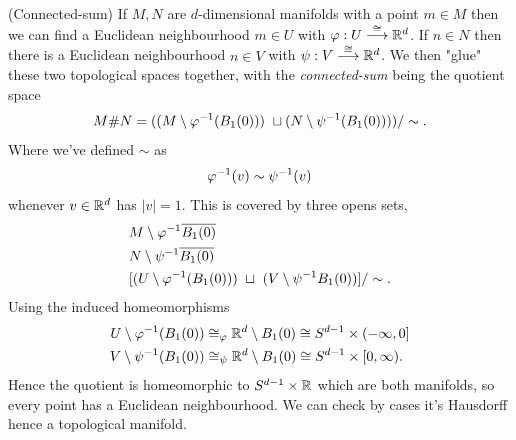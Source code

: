 \documentclass{article}
\begin{document}
\begin{example}
	(Connected-sum) If $ M, N$ are $ d $-dimensional manifolds with a point $ m\in M $ then we can find a Euclidean neighbourhood $ m\in U $ with $ \varphi: U \overset{\cong}{\longrightarrow} \mathbb{R}^d $. If $ n\in N $ then there is a Euclidean neighbourhood $ n\in V $ with $ \psi: V\overset{\cong}{\longrightarrow}\mathbb{R}^d $. We then "glue" these two topological spaces together, with the \textit{connected-sum} being the quotient space
	\[
	  M\#N = ((M \setminus {\varphi}^{-1}(B_1(0))) \ \sqcup (N\setminus {\psi}^{-1} (B_1(0))))/ \sim.
	\]
	Where we've defined $ \sim $ as
	\[
	  {\varphi}^{-1}(v) \sim {\psi}^{-1}(v)
	\]
	whenever $ v\in \mathbb{R}^d $ has $ |v| = 1 $. This is covered by three opens sets,
	\begin{align*}
		&M\setminus {\varphi}^{-1}\overline {B_1(0)} \\
		&N \setminus {\psi}^{-1}\overline{B_1(0)} \\
		&[(U \setminus {\varphi}^{-1}(B_1(0))) \ \sqcup \ (V\setminus {\psi}^{-1} B_1(0))]/\sim.
	\end{align*}
	Using the induced homeomorphisms
	\begin{align*}
		U\setminus {\varphi}^{-1}(B_1(0)) &\cong_\varphi \mathbb{R}^d \setminus B_1(0) \cong S^{d-1}\times (-\infty, 0] \\
		V\setminus {\psi}^{-1}(B_1(0)) &\cong_\psi \mathbb{R}^d\setminus B_1(0) \cong S^{d-1} \times [0,\infty).
	\end{align*}
	Hence the quotient is homeomorphic to $ S^{d-1}\times \mathbb{R} $ which are both manifolds, so every point has a Euclidean neighbourhood. We can check by cases it's Hausdorff hence a topological manifold.
\end{example}
\end{document}
